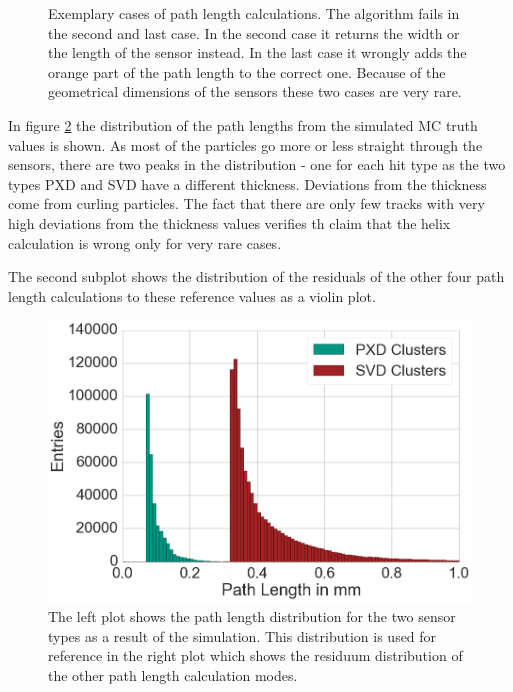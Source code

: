 \begin{figure}
  \caption{Exemplary cases of path length calculations. The algorithm fails in the second and last case. In the second case it returns the width or the length of the sensor instead. In the last case it wrongly adds the orange part of the path length to the correct one. Because of the geometrical dimensions of the sensors these two cases are very rare.}
  \label{fig-errors-in-path-length}
\end{figure}

In figure \ref{fig-pathlengths} the distribution of the path lengths from the simulated MC truth values is shown. As most of the particles go more or less straight through the sensors, there are two peaks in the distribution - one for each hit type as the two types PXD and SVD have a different thickness. Deviations from the thickness come from curling particles. The fact that there are only few tracks with very high deviations from the thickness values verifies th claim that the helix calculation is wrong only for very rare cases.

The second subplot shows the distribution of the residuals of the other four path length calculations to these reference values as a violin plot.


\begin{figure}
 \centering
  \includegraphics[width=0.5\linewidth]{figures/vxd/pathlengthHitType.png}
 \caption{The left plot shows the path length distribution for the two sensor types as a result of the simulation. This distribution is used for reference in the right plot which shows the residuum distribution of the other path length calculation modes.}
 \label{fig-pathlengths}
\end{figure}

